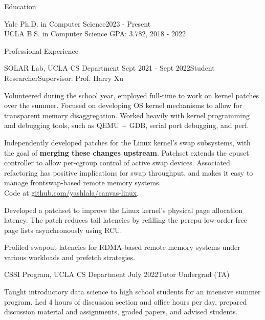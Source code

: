 \documentclass{resume} %
\begin{document}
\begin{resumeSection}{Education}

Yale Ph.D. in Computer Science\hfill 2023 - Present \\
UCLA B.S. in Computer Science
	\hfill GPA: 3.782, 2018 - 2022

\end{resumeSection}


\begin{resumeSection}{Professional Experience} \itemsep -12pt

\begin{resumeSubsection}{SOLAR Lab, UCLA CS Department} 
	{Sept 2021 - Sept 2022}{Student Researcher}{Supervisor: Prof. Harry Xu}
\item Volunteered during the school year, employed full-time to work on kernel
	patches over the summer. Focused on developing OS kernel mechanisms to
	allow for transparent memory disaggregation. Worked heavily with kernel
	programming and debugging tools, such as QEMU + GDB, serial port
	debugging, and perf. 
\item Independently developed patches for the Linux kernel's swap subsystems,
	with the goal of \textbf{merging these changes upstream}. Patchset
	extends the cpuset controller to allow per-cgroup control of active
	swap devices. Associated refactoring has positive implications for swap
	throughput, and makes it easy to manage frontswap-based remote memory
	systems. \\
	Code at 
	\href{https://github.com/yashlala/canvas-linux}{github.com/yashlala/canvas-linux}.
\item Developed a patchset to improve the Linux kernel's physical page
	allocation latency. The patch reduces tail latencies by refilling the
	percpu low-order free page lists asynchronously using RCU. 
\item Profiled swapout latencies for RDMA-based remote memory systems under
	various workloads and prefetch strategies. 
\end{resumeSubsection}

\begin{resumeSubsection}{CSSI Program, UCLA CS Department}
	{July 2022}{Tutor Undergrad (TA)}{}
\item Taught introductory data science to high school students for an intensive
	summer program. Led 4 hours of discussion section and office hours per
	day, prepared discussion material and assignments, graded papers, and
	advised students. 
\end{resumeSubsection}


\end{resumeSection}
\end{document}
